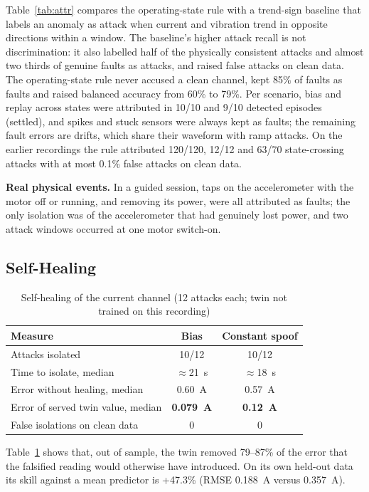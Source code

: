 \documentclass[conference]{IEEEtran}
\begin{document}
Table~\ref{tab:attr} compares the operating-state rule with a trend-sign baseline that labels an anomaly as attack when current and vibration trend in opposite directions within a window. The baseline's higher attack recall is not discrimination: it also labelled half of the physically consistent attacks and almost two thirds of genuine faults as attacks, and raised false attacks on clean data. The operating-state rule never accused a clean channel, kept 85\% of faults as faults and raised balanced accuracy from 60\% to 79\%. Per scenario, bias and replay across states were attributed in 10/10 and 9/10 detected episodes (settled), and spikes and stuck sensors were always kept as faults; the remaining fault errors are drifts, which share their waveform with ramp attacks. On the earlier recordings the rule attributed 120/120, 12/12 and 63/70 state-crossing attacks with at most 0.1\% false attacks on clean data.

\textbf{Real physical events.} In a guided session, taps on the accelerometer with the motor off or running, and removing its power, were all attributed as faults; the only isolation was of the accelerometer that had genuinely lost power, and two attack windows occurred at one motor switch-on.

\subsection{Self-Healing}

\begin{table}[t]
\centering
\caption{Self-healing of the current channel (12 attacks each; twin not trained on this recording)}
\label{tab:heal}
\footnotesize
\setlength{\tabcolsep}{4pt}
\begin{tabular}{@{}lcc@{}}
\toprule
Measure & Bias & Constant spoof \\
\midrule
Attacks isolated & 10/12 & 10/12 \\
Time to isolate, median & $\approx$21~s & $\approx$18~s \\
Error without healing, median & 0.60~A & 0.57~A \\
Error of served twin value, median & \textbf{0.079~A} & \textbf{0.12~A} \\
False isolations on clean data & 0 & 0 \\
\bottomrule
\end{tabular}
\end{table}

Table~\ref{tab:heal} shows that, out of sample, the twin removed 79--87\% of the error that the falsified reading would otherwise have introduced. On its own held-out data its skill against a mean predictor is +47.3\% (RMSE 0.188~A versus 0.357~A).
\end{document}
